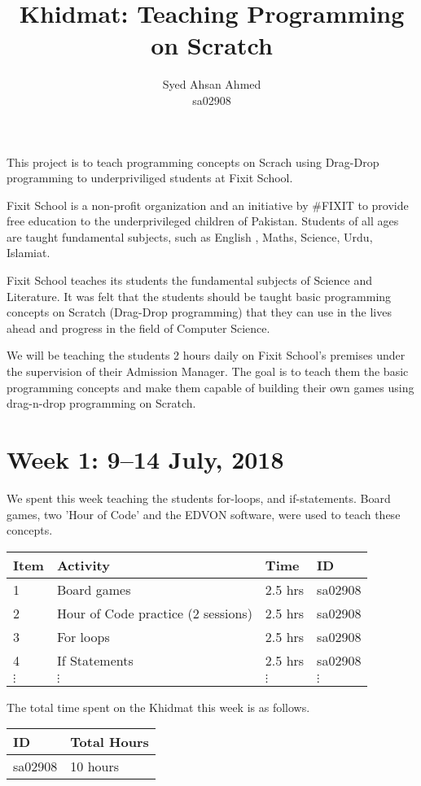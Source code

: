 \documentclass{article}
\title {Khidmat: Teaching Programming on Scratch}
\author{
  Syed Ahsan Ahmed\\ sa02908
}
\date{}
\begin{document}
\maketitle

This project is to teach programming concepts on Scrach using Drag-Drop programming to underpriviliged students at Fixit School.

Fixit School is a non-profit organization and an initiative by #FIXIT to provide free education to the underprivileged children of Pakistan. Students of all ages are taught fundamental subjects, such as English , Maths, Science, Urdu, Islamiat. 

Fixit School teaches its students the fundamental subjects of Science and Literature. It was felt that the students should be taught basic programming concepts on Scratch (Drag-Drop programming) that they can use in the lives ahead and progress in the field of Computer Science.

We will be teaching the students 2 hours daily on Fixit School's premises under the supervision of their Admission Manager. The goal is to teach them the basic programming concepts and make them capable of building their own games using drag-n-drop programming on Scratch.

\newpage
\section*{Week 1: 9--14 July, 2018}

We spent this week teaching the students for-loops, and if-statements. Board games, two 'Hour of Code' and the EDVON software, were used to teach these concepts.

\begin{tabular}{|l|l|l|l|}
  \hline
  Item 	& Activity & Time & ID \\\hline\hline
  1	& Board games & 2.5 hrs & sa02908 \\\hline
  2	& Hour of Code practice (2 sessions) & 2.5 hrs & sa02908 \\\hline
  3	& For loops & 2.5 hrs & sa02908 \\\hline
  4 & If Statements & 2.5 hrs & sa02908 \\\hline
  $\vdots$ & $\vdots$ & $\vdots$ & $\vdots$ \\\hline
\end{tabular}

The total time spent on the Khidmat this week is as follows.

\begin{tabular}{|l|l|}
  \hline
  ID & Total Hours\\\hline\hline
  sa02908 & 10 hours\\\hline
\end{tabular}
\end{document}
